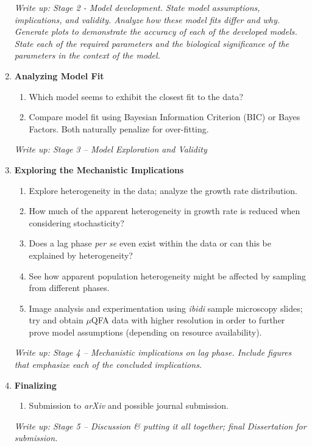 \documentclass{bioinfo}
\begin{document}
\begin{enumerate}
\textit{Write up: Stage 2 - Model development. State model assumptions, implications, and validity. Analyze how these model fits differ and why. Generate plots to demonstrate the accuracy of each of the developed models. State each of the required parameters and the biological significance of the parameters in the context of the model.} \\

\item \textbf{Analyzing Model Fit}
	\begin{enumerate}
    \item Which model seems to exhibit the closest fit to the data? 
    \item Compare model fit using Bayesian Information Criterion (BIC) or Bayes Factors. Both naturally penalize for over-fitting.
    \end{enumerate}

\textit{Write up: Stage 3 – Model Exploration and Validity} \\

\item \textbf{Exploring the Mechanistic Implications}
    \begin{enumerate}
    \item Explore heterogeneity in the data; analyze the growth rate distribution. 
    \item How much of the apparent heterogeneity in growth rate is reduced when considering stochasticity?
    \item Does a lag phase \textit{per se} even exist within the data or can this be explained by heterogeneity?
    \item See how apparent population heterogeneity might be affected by sampling from different phases.
    \item Image analysis and experimentation using \textit{ibidi} sample microscopy slides; try and obtain $\mu$QFA data with higher resolution in order to further prove model assumptions (depending on resource availability).
    \end{enumerate}

\textit{Write up: Stage 4 – Mechanistic implications on lag phase. Include figures that emphasize each of the concluded implications.} \\

\item \textbf{Finalizing}
	\begin{enumerate}
    \item Submission to \textit{arXiv} and possible journal submission. 
	\end{enumerate}

\textit{Write up: Stage 5 – Discussion \& putting it all together; final Dissertation for submission.}
\end{enumerate} 
\end{document}
